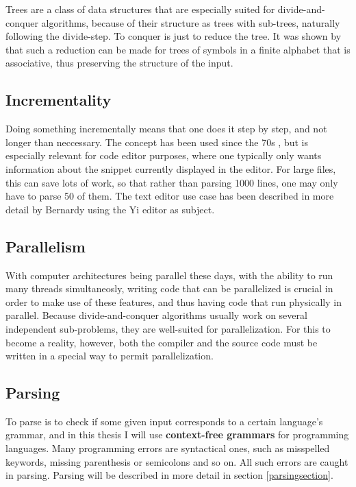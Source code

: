 \documentclass[a4paper,12pt,twosided]{report}
\renewcommand\cite{\citep}
\begin{document}
Trees are a class of data structures that are especially suited for 
divide-and-conquer algorithms, because of their structure as trees with
sub-trees, naturally following the divide-step. To conquer is just to reduce the
tree. It was shown by \citet{parparsepaper} that such a reduction can be made
for trees of symbols in a finite alphabet that is associative, thus preserving
the structure of the input. 

\subsection{Incrementality}
Doing something incrementally means that one does it step by step, and not
longer than neccessary. The concept has been used since the 70s
\cite{incrementalpaper}, but is especially relevant for code editor purposes,
where one typically only wants information about the snippet currently displayed
in the editor. For large files, this can save lots of work, so that rather than
parsing 1000 lines, one may only have to parse 50 of them. The text editor use
case has been described in more detail by Bernardy \cite{lazyfunctional} using
the Yi editor as subject. 

\subsection{Parallelism}
With computer architectures being parallel these days, with the ability to run
many threads simultaneosly, writing code that can be parallelized is crucial in
order to make use of these features, and thus having code that run physically in
parallel. Because divide-and-conquer algorithms usually work on several
independent sub-problems, they are well-suited for parallelization. For this to
become a reality, however, both the compiler and the source code must be written
in a special way to permit parallelization.

\subsection{Parsing}
To parse is to check if some given input corresponds to a certain language's
grammar, and in this thesis I will use \textbf{context-free grammars} for
programming languages. Many programming errors are syntactical ones, such as
misspelled keywords, missing parenthesis or semicolons and so on. All such
errors are caught in parsing. Parsing will be described in more detail in
section \ref{parsingsection}.
\end{document}
